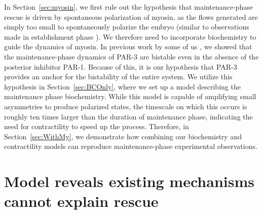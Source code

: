 \documentclass[11pt]{article}
\newcommand{\6}[1]{#1_{\text{6}}}
\newcommand{\3}[1]{#1_{\text{3}}}
\begin{document}
In Section\ \ref{sec:myosin}, we first rule out the hypothesis that maintenance-phase rescue is driven by spontaneous polarization of myosin, as the flows generated are simply too small to spontaneously polarize the embryo (similar to observations made in establishment phase \cite{nishikawa2017controlling}). We therefore need to incorporate biochemistry to guide the dynamics of myosin. In previous work by some of us \cite{lang2023oligomerization}, we showed that the maintenance-phase dynamics of PAR-3 are bistable even in the absence of the posterior inhibitor PAR-1. Because of this, it is our hypothesis that PAR-3 provides an anchor for the bistability of the entire system. We utilize this hypothesis in Section\ \ref{sec:BCOnly}, where we set up a model describing the maintenance phase biochemistry. While this model is capable of amplifying small asymmetries to produce polarized states, the timescale on which this occurs is roughly ten times larger than the duration of maintenance phase, indicating the need for contractility to speed up the process. Therefore, in Section\ \ref{sec:WithMy}, we demonstrate how combining our biochemistry and contractility models can reproduce maintenance-phase experimental observations.



\section{Model reveals existing mechanisms cannot explain rescue \label{sec:myosin}}
\end{document}

